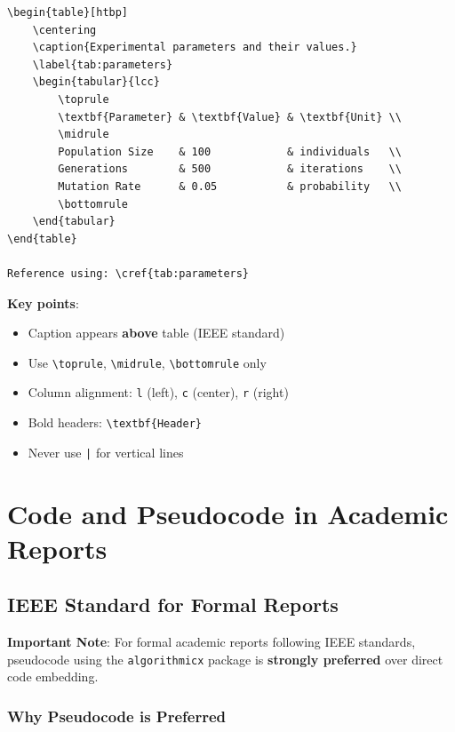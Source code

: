\begin{verbatim}
\begin{table}[htbp]
    \centering
    \caption{Experimental parameters and their values.}
    \label{tab:parameters}
    \begin{tabular}{lcc}
        \toprule
        \textbf{Parameter} & \textbf{Value} & \textbf{Unit} \\
        \midrule
        Population Size    & 100            & individuals   \\
        Generations        & 500            & iterations    \\
        Mutation Rate      & 0.05           & probability   \\
        \bottomrule
    \end{tabular}
\end{table}

Reference using: \cref{tab:parameters}
\end{verbatim}

\textbf{Key points}:
\begin{itemize}
    \item Caption appears \textbf{above} table (IEEE standard)
    \item Use \texttt{\textbackslash toprule}, \texttt{\textbackslash midrule}, \texttt{\textbackslash bottomrule} only
    \item Column alignment: \texttt{l} (left), \texttt{c} (center), \texttt{r} (right)
    \item Bold headers: \texttt{\textbackslash textbf\{Header\}}
    \item Never use \texttt{|} for vertical lines
\end{itemize}

\section*{Code and Pseudocode in Academic Reports}

\subsection*{IEEE Standard for Formal Reports}

\textbf{Important Note}: For formal academic reports following IEEE standards, pseudocode using the \texttt{algorithmicx} package is \textbf{strongly preferred} over direct code embedding.

\subsubsection*{Why Pseudocode is Preferred}

